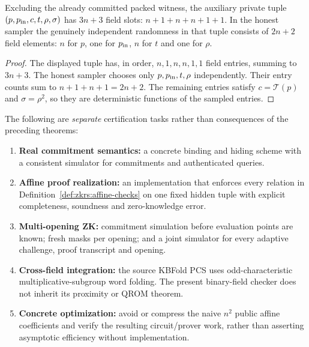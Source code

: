 \begin{lemma}\label{lem:zkrs:hidden-count}
Excluding the already committed packed witness, the auxiliary
private tuple $(p,p_{\rm in},c,t,\rho,\sigma)$ has
$3n+3$ field slots: $n+1+n+n+1+1$.
In the honest sampler the genuinely independent
randomness in that tuple consists of
$2n+2$ field elements: $n$ for $p$,
one for $p_{\rm in}$, $n$ for $t$ and
one for $\rho$.
\end{lemma}
\begin{proof}
The displayed tuple has, in order,
$n,1,n,n,1,1$ field entries, summing to
$3n+3$. The honest sampler chooses
only $p,p_{\rm in},t,\rho$ independently.
Their entry counts sum to
$n+1+n+1=2n+2$.
The remaining entries satisfy
$c=\mathcal T(p)$ and
$\sigma=\rho^2$, so they
are deterministic functions
of the sampled entries.
\end{proof}

\begin{definition}\label{def:zkrs:milestones}
The following are \emph{separate}
certification tasks rather than
consequences of the preceding theorems:
\begin{enumerate}[label=\textup{(\roman*)}]
\item \textbf{Real commitment semantics:}
a concrete binding and hiding scheme
with a consistent simulator for
commitments and authenticated queries.
\item \textbf{Affine proof realization:}
an implementation that enforces every
relation in Definition~\ref{def:zkrs:affine-checks}
on one fixed hidden tuple with explicit
completeness, soundness and zero-knowledge error.
\item \textbf{Multi-opening ZK:}
commitment simulation before evaluation
points are known; fresh masks per opening;
and a joint simulator for every adaptive
challenge, proof transcript and opening.
\item \textbf{Cross-field integration:}
the source KBFold PCS uses odd-characteristic
multiplicative-subgroup word folding.
The present binary-field checker does not
inherit its proximity or QROM theorem.
\item \textbf{Concrete optimization:}
avoid or compress the naive $n^2$
public affine coefficients and verify
the resulting circuit/prover work,
rather than asserting asymptotic
efficiency without implementation.
\end{enumerate}
\end{definition}

